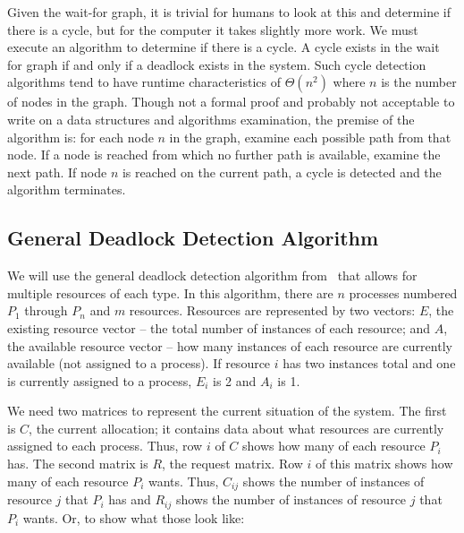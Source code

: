 Given the wait-for graph, it is trivial for humans to look at this and determine if there is a cycle, but for the computer it takes slightly more work. We must execute an algorithm to determine if there is a cycle. A cycle exists in the wait for graph if and only if a deadlock exists in the system. Such cycle detection algorithms tend to have runtime characteristics of $\Theta(n^{2})$ where $n$ is the number of nodes in the graph. Though not a formal proof and probably not acceptable to write on a data structures and algorithms examination, the premise of the algorithm is: for each node $n$ in the graph, examine each possible path from that node. If a node is reached from which no further path is available, examine the next path. If node $n$ is reached on the current path, a cycle is detected and the algorithm terminates.

\subsection*{General Deadlock Detection Algorithm}

We will use the general deadlock detection algorithm from~\cite{mos} that allows for multiple resources of each type. In this algorithm, there are $n$ processes numbered $P_{1}$ through $P_{n}$ and $m$ resources. Resources are represented by two vectors: $E$, the existing resource vector -- the total number of instances of each resource; and $A$, the available resource vector -- how many instances of each resource are currently available (not assigned to a process). If resource $i$ has two instances total and one is currently assigned to a process, $E_{i}$ is 2 and $A_{i}$ is 1.

We need two matrices to represent the current situation of the system. The first is $C$, the current allocation; it contains data about what resources are currently assigned to each process. Thus, row $i$ of $C$ shows how many of each resource $P_{i}$ has. The second matrix is $R$, the request matrix. Row $i$ of this matrix shows how many of each resource $P_{i}$ wants. Thus, $C_{ij}$ shows the number of instances of resource $j$ that $P_{i}$ has and $R_{ij}$ shows the number of instances of resource $j$ that $P_{i}$ wants. Or, to show what those look like:

